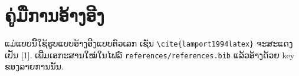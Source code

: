 \chapter*{ຄູ່ມືການອ້າງອີງ}

ແມ່ແບບນີ້ໃຊ້ຮູບແບບອ້າງອີງແບບຕົວເລກ ເຊັ່ນ \verb|\cite{lamport1994latex}| ຈະສະແດງເປັນ [1]. ເພີ່ມເອກະສານໃໝ່ໃນໄຟລ໌ \verb|references/references.bib| ແລ້ວອ້າງດ້ວຍ key ຂອງລາຍການນັ້ນ.
